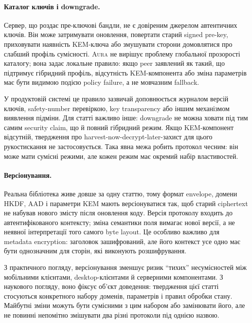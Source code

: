 \documentclass[11pt,a4paper]{article}
\theoremstyle{definition}
\newcommand{\HKDF}{\textsf{HKDF}}
\newcommand{\Aura}{\mbox{\normalfont\scshape Aura}}
\begin{document}
\paragraph{Каталог ключів і downgrade.}
Сервер, що роздає пре-ключові бандли, не є довіреним джерелом
автентичних ключів. Він може затримувати оновлення, повертати
старий signed pre-key, приховувати наявність KEM-ключа або змушувати
сторони домовлятися про слабший профіль сумісності. \Aura{} не
вирішує проблему глобальної прозорості каталогу; вона задає локальне
правило: якщо peer заявлений як такий, що підтримує гібридний профіль,
відсутність KEM-компонента або зміна параметрів має бути видимою
подією policy failure, а не мовчазним fallback.

У продуктовій системі це правило зазвичай доповнюється журналом
версій ключів, safety-number перевіркою, key transparency або іншим
механізмом виявлення підміни. Для статті важливо інше: downgrade не
можна ховати під тим самим security claim, що й повний гібридний
режим. Якщо KEM-компонент відсутній, твердження про
harvest-now-decrypt-later-захист
для цього рукостискання не застосовується. Така явна межа робить
протокол чесним: він може мати сумісні режими, але кожен режим має
окремий набір властивостей.

\paragraph{Версіонування.}
Реальна бібліотека живе довше за одну статтю, тому формат envelope,
домени \HKDF{}, AAD і параметри KEM мають версіонуватися так, щоб
старий ciphertext не набував нового змісту після оновлення коду.
Версія протоколу входить до автентифікованого контексту; зміна
семантики поля вимагає нової версії, а не неявної інтерпретації того
самого byte layout. Це особливо важливо для metadata encryption:
заголовок зашифрований, але його контекст усе одно має бути
однозначним для сторін, які виконують розшифрування.

З практичного погляду, версіонування зменшує ризик ``тихих''
несумісностей між мобільними клієнтами, desktop-клієнтами й серверними
компонентами. З наукового погляду, воно фіксує об'єкт доведення:
твердження цієї статті стосуються конкретного набору доменів,
параметрів і правил обробки стану. Майбутні зміни можуть бути
сумісними з цим набором або замінювати його, але не повинні непомітно
змішувати два різні протоколи під однією назвою.

\end{document}

